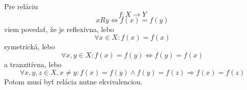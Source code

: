 
Pre reláciu
\[f: X\rightarrow Y\]
\[xRy \Leftrightarrow f(x)=f(y)\]
viem povedať, že je reflexívna, lebo
\[\forall x\in X: f(x)=f(x)\]
symetrická, lebo
\[\forall x,y\in X: f(x)=f(y) \Leftrightarrow f(y)=f(x)\]
a tranzitívna, lebo
\[\forall x,y,z\in X, x\neq y: f(x)=f(y)\wedge f(y)=f(z)\Rightarrow f(x)=f(z)\]
Potom musí byť relácia nutne ekvivalenciou.

